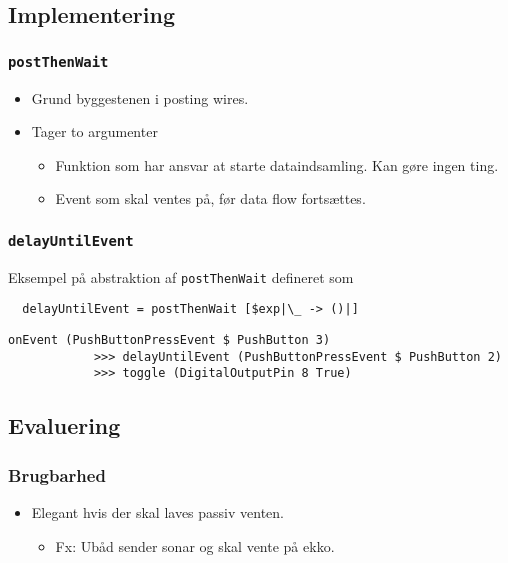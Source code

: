 \documentclass[t]{beamer}
\begin{document}
\subsection{Implementering}

\begin{frame}
  \frametitle{\texttt{postThenWait}}

  \begin{itemize}
  \item Grund byggestenen i posting wires.
  \item Tager to argumenter
    \begin{itemize}
    \item Funktion som har ansvar at starte dataindsamling. Kan gøre ingen ting.
    \item Event som skal ventes på, før data flow fortsættes.
    \end{itemize}
  \end{itemize}

\end{frame}

\begin{frame}[fragile]
  \frametitle{\texttt{delayUntilEvent}}

  Eksempel på abstraktion af \texttt{postThenWait} defineret som

\begin{verbatim}
  delayUntilEvent = postThenWait [$exp|\_ -> ()|]
\end{verbatim}

  \begin{example}
\begin{verbatim}
onEvent (PushButtonPressEvent $ PushButton 3) 
            >>> delayUntilEvent (PushButtonPressEvent $ PushButton 2)
            >>> toggle (DigitalOutputPin 8 True)
\end{verbatim}
  \end{example}

\end{frame}


\subsection{Evaluering}

\begin{frame}
  \frametitle{Brugbarhed}
  
  \begin{itemize}
  \item Elegant hvis der skal laves passiv venten.
    \begin{itemize}
    \item Fx: Ubåd sender sonar og skal vente på ekko.
    \end{itemize}
  \end{itemize}
\end{frame}
\end{document}

